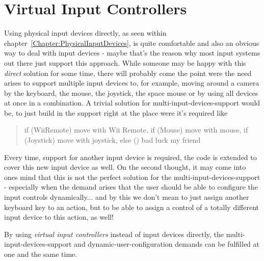 \section{Virtual Input Controllers}
Using physical input devices directly, as seen within chapter~\ref{Chapter:PhysicalInputDevices}, is quite comfortable and also an obvious way to deal with input devices - maybe that's the reason why most input systems out there just support this approach. While someone may be happy with this \emph{direct} solution for some time, there will probably come the point were the need arises to support multiple input devices to, for example, moving around a camera by the keyboard, the mouse, the joystick, the space mouse or by using all devices at once in a combination. A trivial solution for multi-input-devices-support would be, to just build in the support right at the place were it's required like
\begin{quote}if (WiiRemote) move with Wii Remote, if (Mouse) move with mouse, if (Joystick) move with joystick, else () bad luck my friend\end{quote}
Every time, support for another input device is required, the code is extended to cover this new input device as well. On the second thought, it may come into ones mind that this is not the perfect solution for the multi-input-devices-support - especially when the demand arises that the user should be able to configure the input controls dynamically... and by this we don't mean to just assign another keyboard key to an action, but to be able to assign a control of a totally different input device to this action, as well!

By using \emph{virtual input controllers} instead of input devices directly, the multi-input-devices-support and dynamic-user-configuration demands can be fulfilled at one and the same time.
